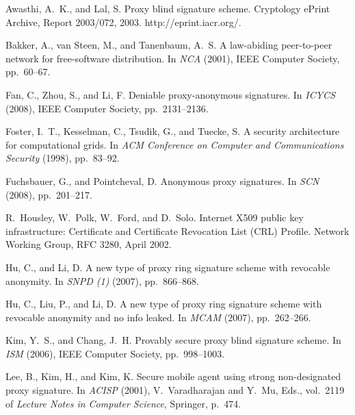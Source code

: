 \documentclass{sig-alternate}
\begin{document}

%

\begin{thebibliography}{10}


{\sc Awasthi, A.~K., and Lal, S.}
\newblock Proxy blind signature scheme.
\newblock Cryptology ePrint Archive, Report 2003/072, 2003.
\newblock http://eprint.iacr.org/.

{\sc Bakker, A., van Steen, M., and Tanenbaum, A.~S.}
\newblock A law-abiding peer-to-peer network for free-software distribution.
\newblock In {\em NCA\/} (2001), IEEE Computer Society, pp.~60--67.

{\sc Fan, C., Zhou, S., and Li, F.}
\newblock Deniable proxy-anonymous signatures.
\newblock In {\em ICYCS\/} (2008), IEEE Computer Society, pp.~2131--2136.

{\sc Foster, I.~T., Kesselman, C., Tsudik, G., and Tuecke, S.}
\newblock A security architecture for computational grids.
\newblock In {\em ACM Conference on Computer and Communications Security\/}
(1998), pp.~83--92.

{\sc Fuchsbauer, G., and Pointcheval, D.}
\newblock Anonymous proxy signatures.
\newblock In {\em SCN\/} (2008), pp.~201--217.

R.~Housley, W.~Polk, W.~Ford, and D.~Solo.
\newblock Internet {X509} public key infrastructure: {Certificate} and
{Certificate Revocation List (CRL)} {P}rofile.
\newblock Network Working Group, RFC 3280, April 2002.

{\sc Hu, C., and Li, D.}
\newblock A new type of proxy ring signature scheme with revocable anonymity.
\newblock In {\em SNPD (1)\/} (2007), pp.~866--868.

{\sc Hu, C., Liu, P., and Li, D.}
\newblock A new type of proxy ring signature scheme with revocable anonymity
and no info leaked.
\newblock In {\em MCAM\/} (2007), pp.~262--266.

{\sc Kim, Y.~S., and Chang, J.~H.}
\newblock Provably secure proxy blind signature scheme.
\newblock In {\em ISM\/} (2006), IEEE Computer Society, pp.~998--1003.

{\sc Lee, B., Kim, H., and Kim, K.}
\newblock Secure mobile agent using strong non-designated proxy signature.
\newblock In {\em ACISP\/} (2001), V.~Varadharajan and Y.~Mu, Eds., vol.~2119
of {\em Lecture Notes in Computer Science}, Springer, p.~474.


\end{thebibliography}
\end{document}
